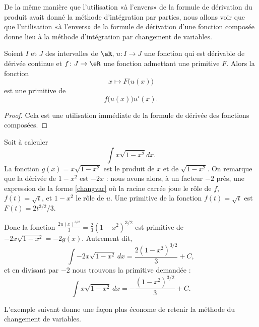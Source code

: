 De la même manière que l'utilisation «à l'envers» de la formule de dérivation du produit avait donné la méthode d'intégration par parties, nous allons voir que que l'utilisation «à l'envers» de la formule de dérivation d'une fonction composée donne lieu à la méthode d'intégration par changement de variables.
\begin{proposition}     \label{PROPooMVIUooZmvHxS}
	Soient \( I\) et \( J\) des intervalles de \( \eR\), \( u\colon I\to J\) une fonction qui est dérivable de dérivée continue et \( f\colon J\to \eR\) une fonction admettant une primitive \( F\). Alors la fonction
	\begin{equation}
		x\mapsto F\big( u(x) \big)
	\end{equation}
	est une primitive de
	\begin{equation}\label{changvar}
		f\big( u(x) \big)u'(x).
	\end{equation}
\end{proposition}

\begin{proof}
	Cela est une utilisation immédiate de la formule de dérivée des fonctions composées.
\end{proof}

\begin{example}
	Soit à calculer
	\begin{equation}
		\int x\sqrt{1-x^2}dx.
	\end{equation}
	La fonction \( g(x) = x\sqrt{1-x^2}\) est le produit de \( x\) et de \( \sqrt{1-x^2}\). On remarque que la dérivée de \( 1-x^2\) est \( -2x\) : nous avons alors, à un facteur \( -2\) près, une expression de la forme \eqref{changvar} où la racine carrée joue le r\^ole de \( f\), \( f(t)=\sqrt{t}\),   et \( 1-x^2\) le r\^ole de \( u\).  Une primitive de la fonction \( f(t)=\sqrt{t}\) est \( F(t) = 2t^{3/2}/3\).

	Donc la fonction
	\(   \frac{ 2u(x)^{3/2} }{ 3 }=\frac{ 2 }{ 3 }(1-x^2)^{3/2}\)
	est primitive de
	\(    -2x\sqrt{1-x^2} = -2 g(x)\).
	Autrement dit,
	\begin{equation}
		\int -2x\sqrt{1-x^2}\,dx=\frac{ 2 (1-x^2)^{3/2}}{ 3 } + C,
	\end{equation}
	et en divisant par \( -2\) nous trouvons la primitive demandée :
	\begin{equation}
		\int x\sqrt{1-x^2}\,dx=-\frac{ (1-x^2)^{3/2} }{ 3 } + C.
	\end{equation}
\end{example}

L'exemple suivant donne une façon plus économe de retenir la méthode du changement de variables.

